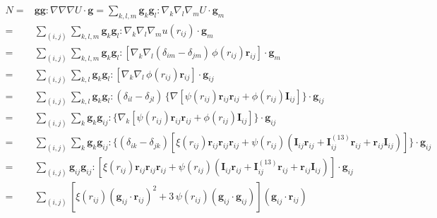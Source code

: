 \documentclass{article}
\begin{document}
\begin{align*}
N =& \mathbf g \mathbf g : \nabla \nabla \nabla U \cdot \mathbf g
  = \sum_{k, l, m} \mathbf g_k \mathbf g_l : \nabla_k \nabla_l \nabla_m U \cdot \mathbf g_m
\\
  =& \sum_{(i, j)} \sum_{k, l, m} \mathbf g_k \mathbf g_l : \nabla_k \nabla_l \nabla_m u(r_{ij}) \cdot \mathbf g_m
\\
  =& \sum_{(i, j)} \sum_{k, l, m} \mathbf g_k \mathbf g_l : [\nabla_k \nabla_l
    (\delta_{im} - \delta_{jm}) \, \phi(r_{ij}) \mathbf r_{ij}] \cdot \mathbf g_m
\\
  =& \sum_{(i, j)} \sum_{k, l} \mathbf g_k \mathbf g_l : [\nabla_k \nabla_l 
    \, \phi(r_{ij}) \mathbf r_{ij}] \cdot \mathbf g_{ij}
\\
  =& \sum_{(i, j)} \sum_{k, l} \mathbf g_k \mathbf g_l : 
    (\delta_{il} - \delta_{jl}) \, 
    \{
    \nabla [\psi(r_{ij}) \mathbf r_{ij} \mathbf r_{ij}
    + \phi(r_{ij}) \mathbf I_{ij}] 
    \}
  \cdot \mathbf g_{ij}
\\
  =& \sum_{(i, j)} \sum_k \mathbf g_k \mathbf g_{ij} : 
    \{
    \nabla_k [\psi(r_{ij}) \mathbf r_{ij} \mathbf r_{ij}
    + \phi(r_{ij}) \mathbf I_{ij}] 
    \}
  \cdot \mathbf g_{ij}
\\
  =& \sum_{(i, j)} \sum_k \mathbf g_k \mathbf g_{ij} : 
    \{
    (\delta_{ik} - \delta_{jk}) 
    [
    \xi(r_{ij}) \mathbf r_{ij} \mathbf r_{ij} \mathbf r_{ij}
   + \psi(r_{ij}) (\mathbf I_{ij} \mathbf r_{ij}
    + \mathbf I_{ij}^{(13)} \mathbf r_{ij}
    + \mathbf r_{ij} \mathbf I_{ij} ) ] 
    \}
  \cdot \mathbf g_{ij}
\\
  =& \sum_{(i, j)} \mathbf g_{ij} \mathbf g_{ij} : 
    [
    \xi(r_{ij}) \mathbf r_{ij} \mathbf r_{ij} \mathbf r_{ij}
    + \psi(r_{ij}) (\mathbf I_{ij} \mathbf r_{ij}
    + \mathbf I_{ij}^{(13)} \mathbf r_{ij}
    +  \mathbf r_{ij} \mathbf I_{ij})] 
  \cdot \mathbf g_{ij}
\\
  =& \sum_{(i, j)} [
    \xi(r_{ij}) (\mathbf g_{ij} \cdot \mathbf r_{ij})^2
    + 3 \, \psi(r_{ij}) (\mathbf g_{ij} \cdot \mathbf g_{ij})] (\mathbf g_{ij} \cdot \mathbf r_{ij}) 
\end{align*}
\end{document}
